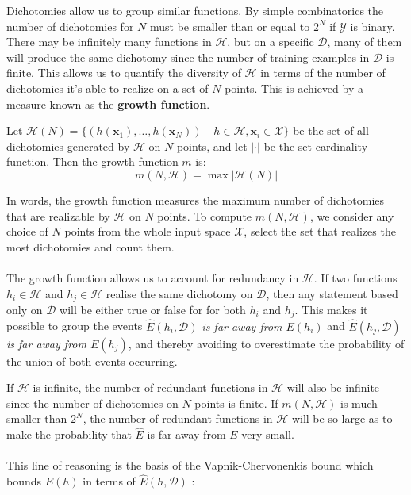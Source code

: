 Dichotomies allow us to group similar functions. By simple combinatorics the number of dichotomies for $N$ must be smaller than or equal to $2^N$ if $\mathcal{Y}$ is binary. There may be infinitely many functions in $\mathcal{H}$, but on a specific $\mathcal{D}$, many of them will produce the same dichotomy since the number of training examples in $\mathcal{D}$ is finite.
This allows us to quantify the diversity of $\mathcal{H}$ in terms of the number of dichotomies it's able to realize on a set of $N$ points. This is achieved by a measure known as the \textbf{growth function}.
\begin{definition}
	\label{growth_function}
	Let $\mathcal{H}(N) = \{(h(\mathbf{x}_1), \dots, h(\mathbf{x}_N))\ \mid h \in \mathcal{H}, \mathbf{x}_i \in \mathcal{X}\}$ be the set of all dichotomies generated by $\mathcal{H}$ on $N$ points, and let $|\cdot|$ be the set cardinality function. Then the growth function $m$ is:
	$$
		m(N, \mathcal{H}) = \max |\mathcal{H}(N)|
	$$
\end{definition}
In words, the growth function measures the maximum number of dichotomies that are realizable by $\mathcal{H}$ on $N$ points. To compute $m(N, \mathcal{H})$, we consider any choice of $N$ points from the whole input space $\mathcal{X}$, select the set that realizes the most dichotomies and count them.
\\\\
The growth function allows us to account for redundancy in $\mathcal{H}$. If two functions $h_i \in \mathcal{H}$ and $h_j \in \mathcal{H}$ realise the same dichotomy on $\mathcal{D}$, then any statement based only on $\mathcal{D}$ will be either true or false for for both $h_i$ and $h_j$. This makes it possible to group the events \textit{$\hat{E}(h_i, \mathcal{D})$ is far away from $E(h_i)$} and \textit{$\hat{E}(h_j, \mathcal{D})$ is far away from $E(h_j)$}, and thereby avoiding to overestimate the probability of the union of both events occurring.

If $\mathcal{H}$ is infinite, the number of redundant functions in $\mathcal{H}$ will also be infinite since the number of dichotomies on $N$ points is finite. If $m(N, \mathcal{H})$ is much smaller than $2^N$, the number of redundant functions in $\mathcal{H}$ will be so large as to make the probability that $\hat{E}$ is far away from $E$ very small.
\\\\
 This line of reasoning is the basis of the Vapnik-Chervonenkis bound which bounds $E(h)$ in terms of $\hat{E}(h, \mathcal{D})$ \citep{vapnik1971}:

